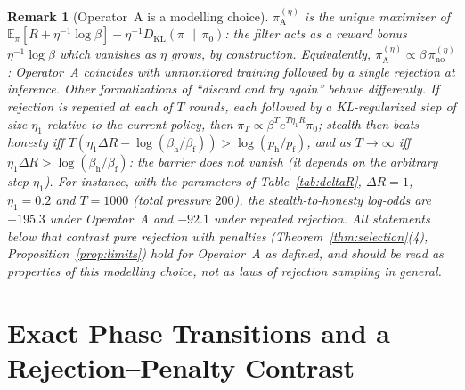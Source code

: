 \documentclass[11pt,a4paper]{article}
\newtheorem{remark}[theorem]{Remark}
\newcommand{\E}{\mathbb{E}}
\newcommand{\DKL}{D_{\mathrm{KL}}}
\begin{document}
\begin{remark}[Operator~A is a modelling choice]\label{rem:modelA}
$\pi_{\mathrm{A}}^{(\eta)}$ is the unique maximizer of $\E_{\pi}[R + \eta^{-1}\log\beta] - \eta^{-1}\DKL(\pi\,\|\,\pi_0)$: the filter acts as a reward bonus $\eta^{-1}\log\beta$ which vanishes as $\eta$ grows, by construction. Equivalently, $\pi_{\mathrm{A}}^{(\eta)} \propto \beta\,\pi_{\mathrm{no}}^{(\eta)}$: Operator~A coincides with unmonitored training followed by a single rejection at inference. Other formalizations of ``discard and try again'' behave differently. If rejection is repeated at each of $T$ rounds, each followed by a KL-regularized step of size $\eta_1$ relative to the current policy, then $\pi_T \propto \beta^T e^{T\eta_1 R}\pi_0$; stealth then beats honesty iff $T(\eta_1\Delta R - \log(\beta_{\mathrm{h}}/\beta_{\mathrm{f}})) > \log(p_{\mathrm{h}}/p_{\mathrm{f}})$, and as $T \to \infty$ iff $\eta_1\Delta R > \log(\beta_{\mathrm{h}}/\beta_{\mathrm{f}})$: the barrier does not vanish (it depends on the arbitrary step $\eta_1$). For instance, with the parameters of Table~\ref{tab:deltaR}, $\Delta R = 1$, $\eta_1 = 0.2$ and $T = 1000$ (total pressure $200$), the stealth-to-honesty log-odds are $+195.3$ under Operator~A and $-92.1$ under repeated rejection. All statements below that contrast pure rejection with penalties (Theorem~\ref{thm:selection}(4), Proposition~\ref{prop:limits}) hold for Operator~A as defined, and should be read as properties of this modelling choice, not as laws of rejection sampling in general.
\end{remark}

\section{Exact Phase Transitions and a Rejection--Penalty Contrast}
\end{document}
